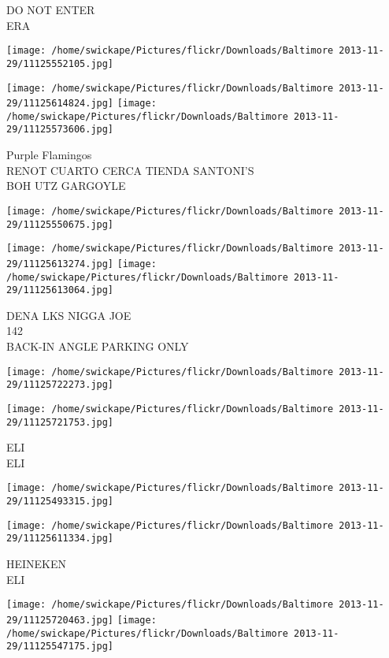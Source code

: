 \documentclass[10pt,letterpaper]{article}
\begin{document}
DO NOT ENTER\\
ERA
\pagebreak

\texttt{[image: /home/swickape/Pictures/flickr/Downloads/Baltimore 2013-11-29/11125552105.jpg]}

\vspace{0.25in}
\texttt{[image: /home/swickape/Pictures/flickr/Downloads/Baltimore 2013-11-29/11125614824.jpg]}
\texttt{[image: /home/swickape/Pictures/flickr/Downloads/Baltimore 2013-11-29/11125573606.jpg]}

Purple Flamingos\\
RENOT CUARTO CERCA TIENDA SANTONI'S\\
BOH UTZ GARGOYLE
\pagebreak

\texttt{[image: /home/swickape/Pictures/flickr/Downloads/Baltimore 2013-11-29/11125550675.jpg]}

\vspace{0.25in}
\texttt{[image: /home/swickape/Pictures/flickr/Downloads/Baltimore 2013-11-29/11125613274.jpg]}
\texttt{[image: /home/swickape/Pictures/flickr/Downloads/Baltimore 2013-11-29/11125613064.jpg]}

DENA LKS NIGGA JOE\\
142\\
BACK{-}IN ANGLE PARKING ONLY
\pagebreak

\texttt{[image: /home/swickape/Pictures/flickr/Downloads/Baltimore 2013-11-29/11125722273.jpg]}

\vspace{0.25in}
\texttt{[image: /home/swickape/Pictures/flickr/Downloads/Baltimore 2013-11-29/11125721753.jpg]}

ELI\\
ELI
\pagebreak

\texttt{[image: /home/swickape/Pictures/flickr/Downloads/Baltimore 2013-11-29/11125493315.jpg]}

\vspace{0.25in}
\texttt{[image: /home/swickape/Pictures/flickr/Downloads/Baltimore 2013-11-29/11125611334.jpg]}

HEINEKEN\\
ELI
\pagebreak

\texttt{[image: /home/swickape/Pictures/flickr/Downloads/Baltimore 2013-11-29/11125720463.jpg]}
\texttt{[image: /home/swickape/Pictures/flickr/Downloads/Baltimore 2013-11-29/11125547175.jpg]}
\end{document}
